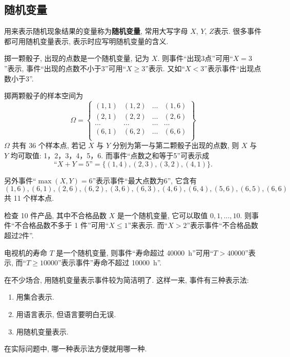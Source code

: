 \subsection{随机变量}

用来表示随机现象结果的变量称为\textbf{随机变量},
常用大写字母 $X$, $Y$, $Z$表示.
很多事件都可用随机变量表示,
表示时应写明随机变量的含义.

\begin{example}
  掷一颗骰子,
  出现的点数是一个随机变量,
  记为 $X$.
  则事件“出现3点”可用“$X = 3$”表示,
  事件“出现的点数不小于3”可用“$X \ge 3$”表示.
  又如“$X < 3$”表示事件“出现点数小于3”.

  掷两颗骰子的样本空间为
  \[
    \Omega =
    \left\{\begin{matrix}
      (1,1) & (1,2) & \dots & (1,6)\\
      (2,1) & (2,2) & \dots & (2,6)\\
      \dots & \dots & \dots & \dots\\
      (6,1) & (6,2) & \dots & (6,6)\\
    \end{matrix}\right\}
  \]
  $\Omega$ 共有 36 个样本点,
  若记 $X$ 与 $Y$ 分别为第一与第二颗骰子出现的点数,
  则 $X$ 与 $Y$ 均可取值:
  1，2，3，4，5，6.
  而事件“点数之和等于5”可表示成
  \[
    “X + Y = 5” = \{(1,4), (2,3), (3,2), (4,1)\}.
  \]

  另外事件“$\max (X,Y) =6$”表示事件“最大点数为6”,
  它含有
  \[
    (1,6),(6,1),(2,6),(6,2),(3,6),(6,3),(4,6),(6,4),(5,6),(6,5),(6,6)
  \]
  共 11 个样本点.
\end{example}

\begin{example}
  检查 10 件产品,
  其中不合格品数 $X$ 是一个随机变量,
  它可以取值 $0,1,\dotsc,10$.
  则事件“不合格品数不多于 1 件”可用“$X \le 1$”来表示. 而“$X>2$”表示事件“不合格品数超过2件”.
\end{example}

\begin{example}
  电视机的寿命 $T$ 是一个随机变量,
  则事件“寿命超过 \SI{40000}{\hour}”可用“$T>40000$”表示,
  而“$T \ge 10000$”表示事件”寿命不超过 \SI{10000}{\hour}”.
\end{example}

在不少场合,
用随机变量表示事件较为简洁明了.
这样一来,
事件有三种表示法:
\begin{enumerate}
  \item 用集合表示.
  \item 用语言表示,
  但语言要明白无误.
  \item 用随机变量表示.
\end{enumerate}
在实际问题中,
哪一种表示法方便就用哪一种.

